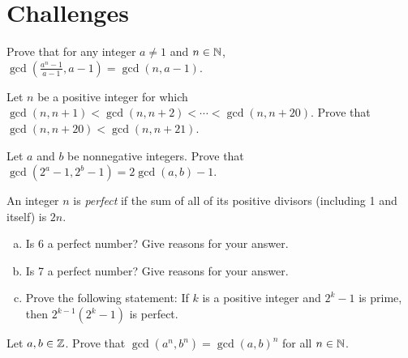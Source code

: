 \section{Challenges}

\begin{challenge}
  Prove that for any integer $a \neq 1$ and $n\in\mathbb{N}$,
  $\gcd\left( \frac{a^n-1}{a-1}, a-1 \right) = \gcd(n, a-1)$.
\end{challenge}

\begin{challenge}
  Let $n$ be a positive integer for which
  $\gcd(n, n + 1) < \gcd(n, n + 2) < \cdots < {\gcd(n, n + 20)}$.
  Prove that $\gcd(n, n + 20) < \gcd(n, n + 21)$.
\end{challenge}

\begin{challenge}
  Let $a$ and $b$ be nonnegative integers.
  Prove that $\gcd(2^a - 1, 2^b - 1) = 2\gcd(a,b) - 1$.
\end{challenge}

\begin{challenge}
  An integer $n$ is \emph{perfect} if the sum of all of its positive divisors
  (including 1 and itself) is $2n$.
  \begin{enumerate}[(a)]
    \item Is 6 a perfect number? Give reasons for your answer.
    \item Is 7 a perfect number? Give reasons for your answer.
    \item Prove the following statement:
          If $k$ is a positive integer and $2^k-1$ is prime, then $2^{k-1}(2^k-1)$ is perfect.
  \end{enumerate}
\end{challenge}

\begin{challenge}
  Let $a,b\in\mathbb{Z}$. Prove that $\gcd(a^n, b^n) = \gcd(a, b)^n$ for all $n\in\mathbb{N}$.
\end{challenge}
